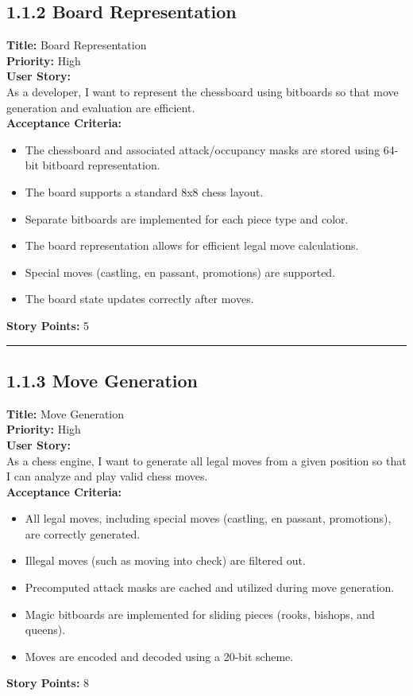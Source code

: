 \documentclass[12pt]{article}
\begin{document}
\subsection{1.1.2 Board Representation}
\textbf{Title:} Board Representation\\
\textbf{Priority:} High\\
\textbf{User Story:}\\
As a developer, I want to represent the chessboard using bitboards so that move generation and evaluation are efficient.\\
\textbf{Acceptance Criteria:}
\begin{itemize}
    \item The chessboard and associated attack/occupancy masks are stored using 64-bit bitboard representation.
    \item The board supports a standard 8x8 chess layout.
    \item Separate bitboards are implemented for each piece type and color.
    \item The board representation allows for efficient legal move calculations.
    \item Special moves (castling, en passant, promotions) are supported.
    \item The board state updates correctly after moves.
\end{itemize}
\textbf{Story Points:} 5

\bigskip
\hrule
\bigskip

\subsection{1.1.3 Move Generation}
\textbf{Title:} Move Generation\\
\textbf{Priority:} High\\
\textbf{User Story:}\\
As a chess engine, I want to generate all legal moves from a given position so that I can analyze and play valid chess moves.\\
\textbf{Acceptance Criteria:}
\begin{itemize}
    \item All legal moves, including special moves (castling, en passant, promotions), are correctly generated.
    \item Illegal moves (such as moving into check) are filtered out.
    \item Precomputed attack masks are cached and utilized during move generation.
    \item Magic bitboards are implemented for sliding pieces (rooks, bishops, and queens).
    \item Moves are encoded and decoded using a 20-bit scheme.
\end{itemize}
\textbf{Story Points:} 8
\end{document}
